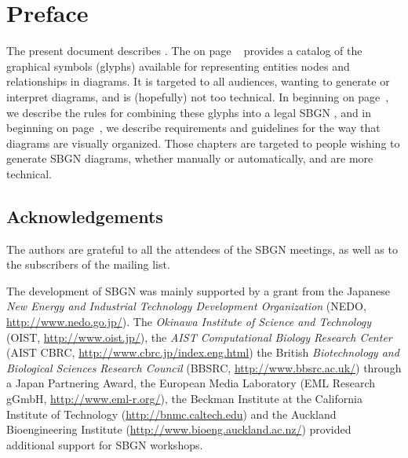 
\chapter{Preface}

The present document describes \SBGNERLone. The  on page ~\pageref{chp:glyph} provides a catalog of the graphical symbols (glyphs) available for representing entities nodes and relationships in \ER diagrams. It is targeted to all audiences, wanting to generate or interpret \ER diagrams, and is (hopefully) not too technical. In  beginning on page~\pageref{chp:grammar}, we describe the rules for combining these glyphs into a legal SBGN \ER, and in  beginning on page~\pageref{chp:layout}, we describe requirements and guidelines for the way that diagrams are visually organized. Those chapters are targeted to people wishing to generate SBGN diagrams, whether manually or automatically, and are more technical.

\section*{Acknowledgements}

The authors are grateful to all the attendees of the SBGN meetings, as well as to the subscribers of the  mailing list.  

% 
The development of SBGN was mainly supported by a grant from the Japanese \emph{New Energy and Industrial Technology Development Organization} (NEDO, \url{http://www.nedo.go.jp/}).  The \emph{Okinawa Institute of Science and Technology} (OIST, \url{http://www.oist.jp/}), the \emph{AIST Computational Biology Research Center} (AIST CBRC, \url{http://www.cbrc.jp/index.eng.html}) the British \emph{Biotechnology and Biological Sciences Research Council} (BBSRC, \url{http://www.bbsrc.ac.uk/}) through a Japan Partnering Award, the European Media Laboratory (EML Research gGmbH, \url{http://www.eml-r.org/}), the Beckman Institute at the California Institute of Technology (\url{http://bnmc.caltech.edu}) and the Auckland Bioengineering Institute (\url{http://www.bioeng.auckland.ac.nz/}) provided additional support for SBGN workshops.

